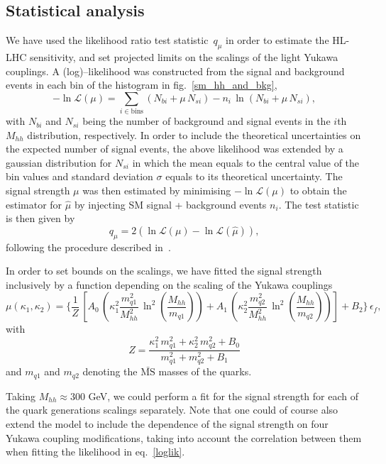 \subsection{Statistical analysis}
We have used the likelihood ratio test statistic~$q_\mu$ in order to estimate the HL-LHC sensitivity, and set projected limits on the scalings of the light Yukawa couplings. A (log)--likelihood was constructed from the signal and background events in each bin of the histogram in fig.~\ref{sm_hh_and_bkg},
\begin{equation} \label{loglik}
	- \ln \mathscr L (\mu) = \sum_{i \in \mathrm{bins}} (N_{bi} + \mu\, N_{si}) - n_i\, \ln(N_{bi} + \mu\, N_{si}),
\end{equation}
with  $N_{bi}$ and $N_{si}$ being the number of background  and signal events in the $i$th $ M_{hh}$ distribution, respectively. In order to include the theoretical uncertainties on the expected number of signal events, the above likelihood was extended by a gaussian distribution for $N_{si}$ in which the mean equals to the central value of the bin values and standard deviation $\sigma$ equals to its theoretical uncertainty.
The signal strength $ \mu$ was then estimated by minimising $- \ln \mathscr L (\mu)$ to obtain the estimator for $\hat \mu$ by injecting SM signal + background events $n_i$. The test statistic is then given by
\begin{equation}
	q_\mu = 2 (\ln \mathscr L (\mu)- \ln \mathscr L ( \hat \mu) ),
\end{equation}
following the procedure described in~\cite{Cowan:2010js}.
\par
In order to set bounds on the scalings, we have fitted the signal strength inclusively by a function depending on the scaling of the Yukawa couplings
\begin{equation}
	\mu(\kappa_1,\kappa_2) = \Bigg\{ \frac{1}{Z}\,\left[ A_0\,
	\left(
	\kappa_1^2 \frac{m_{q1}^2}{M_{hh}^2} \, \ln^2\left(\frac{M_{hh}}{m_{q1}} \right) \right)+ A_1\,\left(\kappa_2^2 \frac{m_{q2}^2}{M_{hh}^2} \, \ln^2 \left(\frac{M_{hh}}{m_{q2}} \right)
	\right)
	\right] + B_2 \Bigg\}\, \epsilon_f,
	\label{modelmu}
\end{equation}
with
\begin{equation}
	Z = \frac{\kappa_1^2 \, m_{q1}^2 +\kappa_2^2 \, m_{q2}^2  + B_0}{m_{q1}^2+m_{q2}^2+ B_1}
\end{equation}
and $m_{q1}$ and $m_{q2}$ denoting the $\bar{\text{MS}}$ masses of the quarks.


Taking $M_{hh} \approx 300$ GeV, we could perform a fit for the signal strength for each of the quark generations scalings separately. Note that one could of course also extend the model to include the dependence of the signal strength on four Yukawa coupling modifications, taking into account the correlation between them when fitting the likelihood in eq.~\eqref{loglik}.

